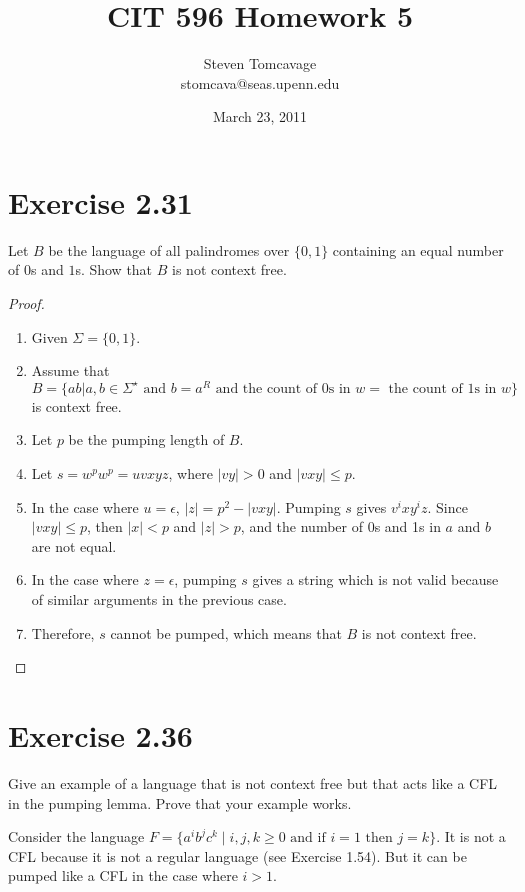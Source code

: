 \documentclass{article}
\title{CIT 596 Homework 5}
\author{Steven Tomcavage\\stomcava@seas.upenn.edu}
\date{March 23, 2011}
\newcommand{\where}{\mid}
\begin{document}
\maketitle

\section{Exercise 2.31}

Let $B$ be the language of all palindromes over $\{0, 1\}$ containing an equal
number of $0$s and $1$s. Show that $B$ is not context free.

\begin{proof}
	\mbox{}
	\begin{enumerate}
	  \item Given $\Sigma = \{ 0, 1 \}$.
	  \item Assume that $B = \{ ab | a, b \in \Sigma^\star \text{ and } b = a^R
	  \text{ and the count of 0s in } w = \text{ the count of 1s in } w \}$ is
	  context free.
	  \item Let $p$ be the pumping length of $B$.
	  \item Let $s = w^pw^p = uvxyz$, where $|vy| > 0$ and $|vxy| \leq p$.
	  \item In the case where $u = \epsilon$, $|z| = p^2 - |vxy|$. Pumping $s$
	  gives $v^ixy^iz$. Since $|vxy| \leq p$, then $|x| < p$ and $|z| > p$, and the
	  number of 0s and 1s in $a$ and $b$ are not equal.
	  \item In the case where $z = \epsilon$, pumping $s$ gives a string which is
	  not valid because of similar arguments in the previous case.
	  \item Therefore, $s$ cannot be pumped, which means that $B$ is not context
	  free. \qedhere
	\end{enumerate}
\end{proof}

\section{Exercise 2.36}

Give an example of a language that is not context free but that acts like a CFL
in the pumping lemma. Prove that your example works. 

Consider the language $F = \{a^i b^j c^k \where i, j, k \geq 0 \text{ and if }
i = 1 \text{ then } j = k\}$. It is not a CFL because it is not a regular
language (see Exercise 1.54). But it can be pumped like a CFL in the case where
$i > 1$. 
\end{document}
